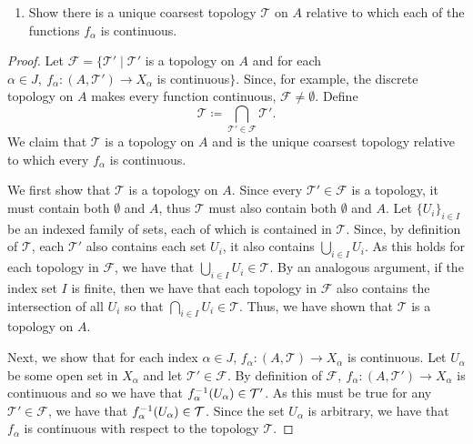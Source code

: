 \begin{solution}
    \begin{enumerate}[label={(\alph*)}, align=left, leftmargin=\parindent, listparindent=\parindent, labelwidth=0pt, itemindent=!]
        \item Show there is a unique coarsest topology $\mathcal{T}$ on $A$ relative to which each of the functions $f_\alpha$ is continuous.
    \end{enumerate}
    \begin{proof}
        Let $\mathcal{F} = \{\mathcal{T}' \mid \mathcal{T}'$ is a topology on $A$ and for each $\alpha \in J,~ f_\alpha: (A, \mathcal{T}') \rightarrow X_\alpha$ is continuous$\}$.
        Since, for example, the discrete topology on $A$ makes every function continuous, $\mathcal{F} \neq \emptyset$.
        Define
        \begin{equation*}
            \mathcal{T} \coloneq \bigcap_{\mathcal{T}' \in \mathcal{F}} \mathcal{T}'.
        \end{equation*}
        We claim that $\mathcal{T}$ is a topology on $A$ and is the unique coarsest topology relative to which every $f_\alpha$ is continuous.

        We first show that $\mathcal{T}$ is a topology on $A$.
        Since every $\mathcal{T}' \in \mathcal{F}$ is a topology, it must contain both $\emptyset$ and $A$, thus $\mathcal{T}$ must also contain both $\emptyset$ and $A$.
        Let $\{U_i\}_{i \in I}$ be an indexed family of sets, each of which is contained in $\mathcal{T}$.
        Since, by definition of $\mathcal{T}$, each $\mathcal{T}'$ also contains each set $U_i$, it also contains $\bigcup_{i \in I} U_i$.
        As this holds for each topology in $\mathcal{F}$, we have that $\bigcup_{i \in I} U_i \in \mathcal{T}$.
        By an analogous argument, if the index set $I$ is finite, then we have that each topology in $\mathcal{F}$ also contains the intersection of all $U_i$ so that $\bigcap_{i \in I} U_i \in \mathcal{T}$.
        Thus, we have shown that $\mathcal{T}$ is a topology on $A$.

        Next, we show that for each index $\alpha \in J$, $f_\alpha: (A, \mathcal{T}) \rightarrow X_\alpha$ is continuous.
        Let $U_\alpha$ be some open set in $X_\alpha$ and let $\mathcal{T}' \in \mathcal{F}$.
        By definition of $\mathcal{F},~ f_\alpha: (A, \mathcal{T}') \rightarrow X_\alpha$ is continuous and so we have that $f_\alpha^{-1}(U_\alpha) \in \mathcal{T}'$.
        As this must be true for any $\mathcal{T}' \in \mathcal{F}$, we have that $f_\alpha^{-1}(U_\alpha) \in \mathcal{T}$.
        Since the set $U_\alpha$ is arbitrary, we have that $f_\alpha$ is continuous with respect to the topology $\mathcal{T}$.


\end{proof}
\end{solution}
